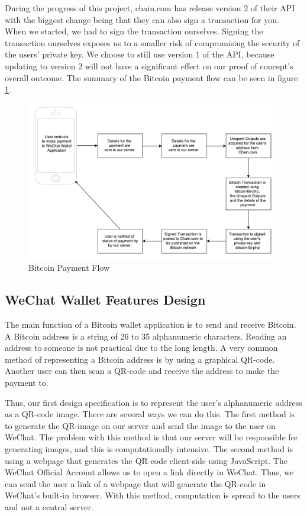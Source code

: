 During the progress of this project, chain.com has release version 2 of their API with the biggest change being that they can also sign a transaction for you. When we started, we had to sign the transaction ourselves. Signing the transaction ourselves exposes us to a smaller risk of compromising the security of the users' private key. We choose to still use version 1 of the API, because updating to version 2 will not have a significant effect on our proof of concept's overall outcome. The summary of the Bitcoin payment flow can be seen in figure \ref{fig:bitcoin_payment_flow}.

\begin{figure}
  \centering
    \includegraphics[width=\textwidth]{figs/Bitcoin_payment_flow.pdf}
   \caption{Bitcoin Payment Flow} 
   \label{fig:bitcoin_payment_flow}
\end{figure}

\subsection{WeChat Wallet Features Design}

The main function of a Bitcoin wallet application is to send and receive Bitcoin. A Bitcoin address is a string of 26 to 35 alphanumeric characters. Reading an address to someone is not practical due to the long length. A very common method of representing a Bitcoin address is by using a graphical QR-code. Another user can then scan a QR-code and receive the address to make the payment to.

Thus, our first design specification is to represent the user's alphanumeric address as a QR-code image. There are several ways we can do this. The first method is to generate the QR-image on our server and send the image to the user on WeChat. The problem with this method is that our server will be responsible for generating images, and this is computationally intensive. The second method is using a webpage that generates the QR-code client-side using JavaScript. The WeChat Official Account allows us to open a link directly in WeChat. Thus, we can send the user a link of a webpage that will generate the QR-code in WeChat's built-in browser. With this method, computation is spread to the users and not a central server. 


